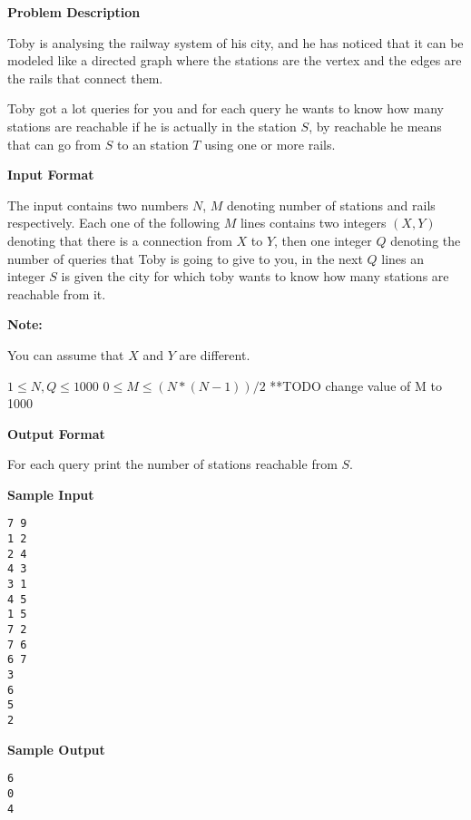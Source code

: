 \textbf{\large Problem Description}

Toby is analysing the railway system of his city, and he has noticed that it can be modeled like a directed graph where the stations are the vertex and the edges are the rails that connect them.

Toby got a lot queries for you and for each query he wants to know how many stations are reachable if he is actually in the station $S$, by reachable he means that can go from $S$ to an station $T$ using one or more rails.

\textbf{\large Input Format}

The input contains two numbers $N$, $M$ denoting number of stations and rails respectively. Each one of the following $M$ lines contains two integers $(X, Y)$ denoting that there is a connection from $X$ to $Y$, then one integer $Q$ denoting the number of queries that Toby is going to give to you, in the next $Q$ lines an integer $S$ is given the city for which toby wants to know how many stations are reachable from it.

\textbf{\large Note:}

You can assume that $X$ and $Y$ are different.

$1 \le N, Q \le 1000$
$0 \le M \le (N * (N - 1)) / 2$ **TODO change value of M to 1000


\textbf{\large Output Format}

For each query print the number of stations reachable from $S$.

\textbf{\large Sample Input}

\begin{verbatim}
7 9
1 2
2 4
4 3
3 1
4 5
1 5
7 2
7 6
6 7
3
6
5
2
\end{verbatim}

\textbf{\large Sample Output}

\begin{verbatim}
6
0
4
\end{verbatim}
